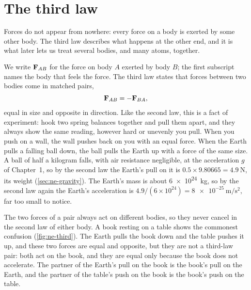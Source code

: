 \section{The third law}
\label{sec:ne-third}

Forces do not appear from nowhere: every force on a body is exerted by
some other body. The third law describes what happens at the other end,
and it is what later lets us treat several bodies, and many atoms,
together.

We write $\bm{\mathrm{F}}_{AB}$ for the force on body $A$ exerted by body $B$; the
first subscript names the body that feels the force. The third law states
that forces between two bodies come in matched pairs,
\begin{equation*}
   \bm{\mathrm{F}}_{AB} = -\bm{\mathrm{F}}_{BA} ,
\end{equation*}
equal in size and opposite in direction. Like the second law, this is a
fact of experiment: hook two spring balances together and pull them apart,
and they always show the same reading, however hard or unevenly you pull.
When you push on a wall, the wall pushes back on you with an equal force.
When the Earth pulls a falling ball down, the ball pulls the Earth up with
a force of the same size. A ball of half a kilogram falls, with air
resistance negligible, at the acceleration $g$ of Chapter~1, so by the
second law the Earth's pull on it is $0.5\times9.80665 =
\SI{4.9}{\newton}$, its weight (\cref{sec:ne-gravity}). The Earth's mass
is about \SI{6e24}{\kilogram}, so by the second law again the Earth's
acceleration is
$4.9/(6\times10^{24}) = \SI{8e-25}{\metre\per\second\squared}$, far too
small to notice.

The two forces of a pair always act on different bodies, so they never
cancel in the second law of either body. A book resting on a table shows
the commonest confusion (\cref{fig:ne-third}). The Earth pulls the book
down and the table pushes it up, and these two forces are equal and
opposite, but they are not a third-law pair: both act on the book, and
they are equal only because the book does not accelerate. The partner of
the Earth's pull on the book is the book's pull on the Earth, and the
partner of the table's push on the book is the book's push on the table.

